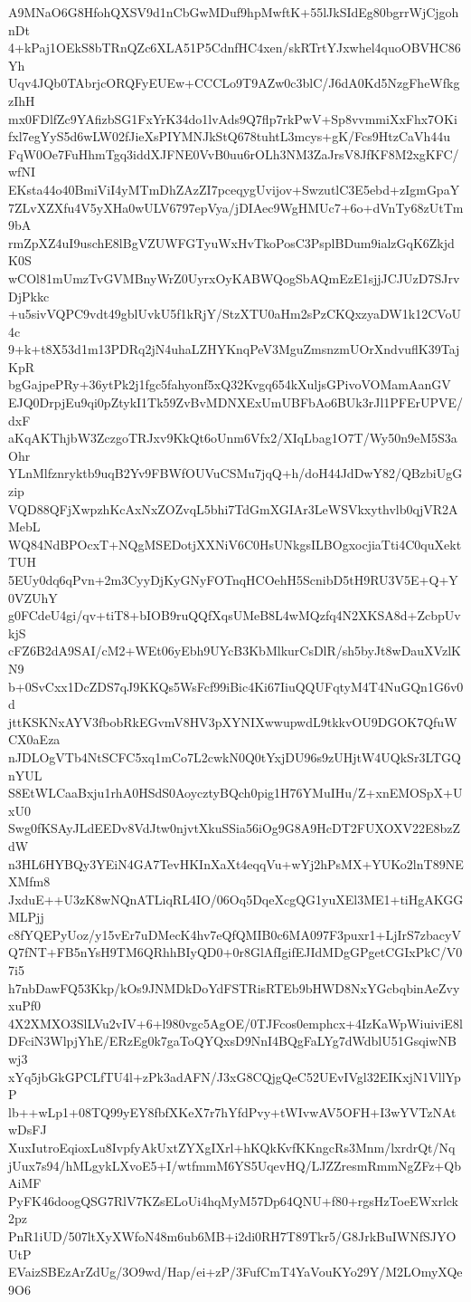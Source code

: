 A9MNaO6G8HfohQXSV9d1nCbGwMDuf9hpMwftK+55lJkSIdEg80bgrrWjCjgohnDt
4+kPaj1OEkS8bTRnQZc6XLA51P5CdnfHC4xen/skRTrtYJxwhel4quoOBVHC86Yh
Uqv4JQb0TAbrjcORQFyEUEw+CCCLo9T9AZw0c3blC/J6dA0Kd5NzgFheWfkgzIhH
mx0FDlfZc9YAfizbSG1FxYrK34do1lvAds9Q7flp7rkPwV+Sp8vvmmiXxFhx7OKi
fxl7egYyS5d6wLW02fJieXsPIYMNJkStQ678tuhtL3mcys+gK/Fcs9HtzCaVh44u
FqW0Oe7FuHhmTgq3iddXJFNE0VvB0uu6rOLh3NM3ZaJrsV8JfKF8M2xgKFC/wfNI
EKsta44o40BmiViI4yMTmDhZAzZI7pceqygUvijov+SwzutlC3E5ebd+zIgmGpaY
7ZLvXZXfu4V5yXHa0wULV6797epVya/jDIAec9WgHMUc7+6o+dVnTy68zUtTm9bA
rmZpXZ4uI9uschE8lBgVZUWFGTyuWxHvTkoPosC3PsplBDum9ialzGqK6ZkjdK0S
wCOl81mUmzTvGVMBnyWrZ0UyrxOyKABWQogSbAQmEzE1sjjJCJUzD7SJrvDjPkkc
+u5sivVQPC9vdt49gblUvkU5f1kRjY/StzXTU0aHm2sPzCKQxzyaDW1k12CVoU4c
9+k+t8X53d1m13PDRq2jN4uhaLZHYKnqPeV3MguZmsnzmUOrXndvuflK39TajKpR
bgGajpePRy+36ytPk2j1fgc5fahyonf5xQ32Kvgq654kXuljsGPivoVOMamAanGV
EJQ0DrpjEu9qi0pZtykI1Tk59ZvBvMDNXExUmUBFbAo6BUk3rJl1PFErUPVE/dxF
aKqAKThjbW3ZczgoTRJxv9KkQt6oUnm6Vfx2/XIqLbag1O7T/Wy50n9eM5S3aOhr
YLnMlfznryktb9uqB2Yv9FBWfOUVuCSMu7jqQ+h/doH44JdDwY82/QBzbiUgGzip
VQD88QFjXwpzhKcAxNxZOZvqL5bhi7TdGmXGIAr3LeWSVkxythvlb0qjVR2AMebL
WQ84NdBPOcxT+NQgMSEDotjXXNiV6C0HsUNkgsILBOgxocjiaTti4C0quXektTUH
5EUy0dq6qPvn+2m3CyyDjKyGNyFOTnqHCOehH5ScnibD5tH9RU3V5E+Q+Y0VZUhY
g0FCdeU4gi/qv+tiT8+bIOB9ruQQfXqsUMeB8L4wMQzfq4N2XKSA8d+ZcbpUvkjS
cFZ6B2dA9SAI/cM2+WEt06yEbh9UYcB3KbMlkurCsDlR/sh5byJt8wDauXVzlKN9
b+0SvCxx1DcZDS7qJ9KKQs5WsFcf99iBic4Ki67IiuQQUFqtyM4T4NuGQn1G6v0d
jttKSKNxAYV3fbobRkEGvmV8HV3pXYNIXwwupwdL9tkkvOU9DGOK7QfuWCX0aEza
nJDLOgVTb4NtSCFC5xq1mCo7L2cwkN0Q0tYxjDU96s9zUHjtW4UQkSr3LTGQnYUL
S8EtWLCaaBxju1rhA0HSdS0AoycztyBQch0pig1H76YMuIHu/Z+xnEMOSpX+UxU0
Swg0fKSAyJLdEEDv8VdJtw0njvtXkuSSia56iOg9G8A9HcDT2FUXOXV22E8bzZdW
n3HL6HYBQy3YEiN4GA7TevHKInXaXt4eqqVu+wYj2hPsMX+YUKo2lnT89NEXMfm8
JxduE++U3zK8wNQnATLiqRL4IO/06Oq5DqeXcgQG1yuXEl3ME1+tiHgAKGGMLPjj
c8fYQEPyUoz/y15vEr7uDMecK4hv7eQfQMIB0c6MA097F3puxr1+LjIrS7zbacyV
Q7fNT+FB5nYsH9TM6QRhhBIyQD0+0r8GlAfIgifEJIdMDgGPgetCGIxPkC/V07i5
h7nbDawFQ53Kkp/kOs9JNMDkDoYdFSTRisRTEb9bHWD8NxYGcbqbinAeZvyxuPf0
4X2XMXO3SlLVu2vIV+6+l980vgc5AgOE/0TJFcos0emphcx+4IzKaWpWiuiviE8l
DFciN3WlpjYhE/ERzEg0k7gaToQYQxsD9NnI4BQgFaLYg7dWdblU51GsqiwNBwj3
xYq5jbGkGPCLfTU4l+zPk3adAFN/J3xG8CQjgQeC52UEvIVgl32EIKxjN1VllYpP
lb++wLp1+08TQ99yEY8fbfXKeX7r7hYfdPvy+tWIvwAV5OFH+I3wYVTzNAtwDsFJ
XuxIutroEqioxLu8IvpfyAkUxtZYXgIXrl+hKQkKvfKKngcRs3Mnm/lxrdrQt/Nq
jUux7s94/hMLgykLXvoE5+I/wtfmmM6YS5UqevHQ/LJZZresmRmmNgZFz+QbAiMF
PyFK46doogQSG7RlV7KZsELoUi4hqMyM57Dp64QNU+f80+rgsHzToeEWxrlck2pz
PnR1iUD/507ltXyXWfoN48m6ub6MB+i2di0RH7T89Tkr5/G8JrkBuIWNfSJYOUtP
EVaizSBEzArZdUg/3O9wd/Hap/ei+zP/3FufCmT4YaVouKYo29Y/M2LOmyXQe9O6
